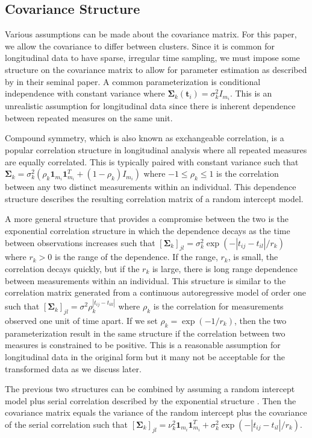 \documentclass[12pt]{article}
\newcommand{\B}[0]{\mathbf}
\begin{document}
\subsection{Covariance Structure}
Various assumptions can be made about the covariance matrix. For this paper, we allow the covariance to differ between clusters. Since it is common for longitudinal data to have sparse, irregular time sampling, we must impose some structure on the covariance matrix to allow for parameter estimation as described by \citet{jennrich1986} in their seminal paper. A common parameterization is conditional independence with constant variance where $\B \Sigma_{k}(\B t_{i}) = \sigma_{k}^{2}I_{m_{i}}$. This is an unrealistic assumption for longitudinal data since there is inherent dependence between repeated measures on the same unit. 

Compound symmetry, which is also known as exchangeable correlation, is a popular correlation structure in longitudinal analysis where all repeated measures are equally correlated. This is typically paired with constant variance such that $\B \Sigma_{k} = \sigma_{k}^{2}(\rho_{k}\B1_{m_{i}}\B1_{m_{i}}^{T}+(1-\rho_{k})I_{m_{i}})$ where $-1\leq\rho_{k}\leq 1$ is the correlation between any two distinct measurements within an individual. This dependence structure describes the resulting correlation matrix of a random intercept model.

A more general structure that provides a compromise between the two is the exponential correlation structure in which the dependence decays as the time between observations increases such that $[\B \Sigma_{k}]_{jl} = \sigma_{k}^{2}\exp(-| t_{ij}-t_{il}| / r_{k})$ where $r_{k}> 0$ is the range of the dependence. If the range, $r_{k}$, is small, the correlation decays quickly, but if the $r_{k}$ is large, there is long range dependence between measurements within an individual. This structure is similar to the correlation matrix generated from a continuous autoregressive model of order one such that $[\B\Sigma_{k}]_{jl} = \sigma^{2}\rho_{k}^{|t_{ij}-t_{ill}|}$ where $\rho_{k}$ is the correlation for measurements observed one unit of time apart. If we set $\rho_{k} = \exp(-1/r_{k})$, then the two parameterization result in the same structure if the correlation between two measures is constrained to be positive. This is a reasonable assumption for longitudinal data in the original form but it many not be acceptable for the transformed data as we discuss later.

The previous two structures can be combined by assuming a random intercept model plus serial correlation described by the exponential structure \cite{diggle2002}. Then the covariance matrix equals the variance of the random intercept plus the covariance of the serial correlation such that $[\B \Sigma_{k}]_{jl}=\nu^{2}_{k}\B 1_{m_{i}}\B 1^{T}_{m_{i}}+\sigma_{k}^{2}\exp(-| t_{ij}-t_{il}| / r_{k})$.\\
\end{document}
